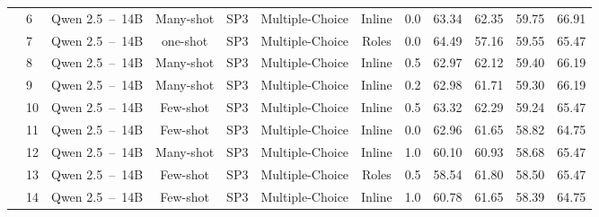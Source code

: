 \begin{table*}[t]
\begin{tabular}{cllccccccccc}
                                    & 6                 & Qwen 2.5~--~14B       & Many-shot     & SP3             & Multiple-Choice         & Inline        & 0.0           & 63.34                 & 62.35             & 59.75                 & 66.91                 \\
                                    & 7                 & Qwen 2.5~--~14B       & one-shot      & SP3             & Multiple-Choice         & Roles         & 0.0           & 64.49                 & 57.16             & 59.55                 & 65.47                 \\
                                    & 8                 & Qwen 2.5~--~14B       & Many-shot     & SP3             & Multiple-Choice         & Inline        & 0.5           & 62.97                 & 62.12             & 59.40                 & 66.19                 \\
                                    & 9                 & Qwen 2.5~--~14B       & Many-shot     & SP3             & Multiple-Choice         & Inline        & 0.2           & 62.98                 & 61.71             & 59.30                 & 66.19                 \\
                                    & 10                & Qwen 2.5~--~14B       & Few-shot      & SP3             & Multiple-Choice         & Inline        & 0.5           & 63.32                 & 62.29             & 59.24                 & 65.47                 \\
                                    & 11                & Qwen 2.5~--~14B       & Few-shot      & SP3             & Multiple-Choice         & Inline        & 0.0           & 62.96                 & 61.65             & 58.82                 & 64.75                 \\
                                    & 12                & Qwen 2.5~--~14B       & Many-shot     & SP3             & Multiple-Choice         & Inline        & 1.0           & 60.10                 & 60.93             & 58.68                 & 65.47                 \\
                                    & 13                & Qwen 2.5~--~14B       & Few-shot      & SP3             & Multiple-Choice         & Roles         & 0.5           & 58.54                 & 61.80             & 58.50                 & 65.47                 \\
                                    & 14                & Qwen 2.5~--~14B       & Few-shot      & SP3             & Multiple-Choice         & Inline        & 1.0           & 60.78                 & 61.65             & 58.39                 & 64.75                 \\

\end{tabular}
\end{table*}
